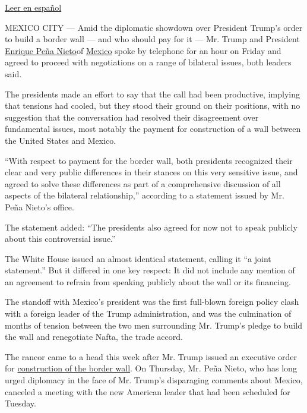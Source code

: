 \href{https://www.nytimes.com/es/2017/01/27/trump-y-pena-nieto-acuerdan-no-hablar-mas-sobre-el-muro-fronterizo-en-publico/}{Leer
en español}

MEXICO CITY --- Amid the diplomatic showdown over President Trump's
order to build a border wall --- and who should pay for it --- Mr. Trump
and President
\href{https://www.nytimes.com/2017/01/08/world/americas/unrest-mexico-pena-nieto-gas-prices-trump.html}{Enrique
Peña Nieto}of
\href{https://www.nytimes.com/topic/destination/mexico?8qa}{Mexico}
spoke by telephone for an hour on Friday and agreed to proceed with
negotiations on a range of bilateral issues, both leaders said.

The presidents made an effort to say that the call had been productive,
implying that tensions had cooled, but they stood their ground on their
positions, with no suggestion that the conversation had resolved their
disagreement over fundamental issues, most notably the payment for
construction of a wall between the United States and Mexico.

``With respect to payment for the border wall, both presidents
recognized their clear and very public differences in their stances on
this very sensitive issue, and agreed to solve these differences as part
of a comprehensive discussion of all aspects of the bilateral
relationship,'' according to a statement issued by Mr. Peña Nieto's
office.

The statement added: ``The presidents also agreed for now not to speak
publicly about this controversial issue.''

The White House issued an almost identical statement, calling it ``a
joint statement.'' But it differed in one key respect: It did not
include any mention of an agreement to refrain from speaking publicly
about the wall or its financing.

The standoff with Mexico's president was the first full-blown foreign
policy clash with a foreign leader of the Trump administration, and was
the culmination of months of tension between the two men surrounding Mr.
Trump's pledge to build the wall and renegotiate Nafta, the trade
accord.

The rancor came to a head this week after Mr. Trump issued an executive
order for
\href{https://www.nytimes.com/2017/01/25/us/politics/refugees-immigrants-wall-trump.html?_r=0}{construction
of the border wall}. On Thursday, Mr. Peña Nieto, who has long urged
diplomacy in the face of Mr. Trump's disparaging comments about Mexico,
canceled a meeting with the new American leader that had been scheduled
for Tuesday.

